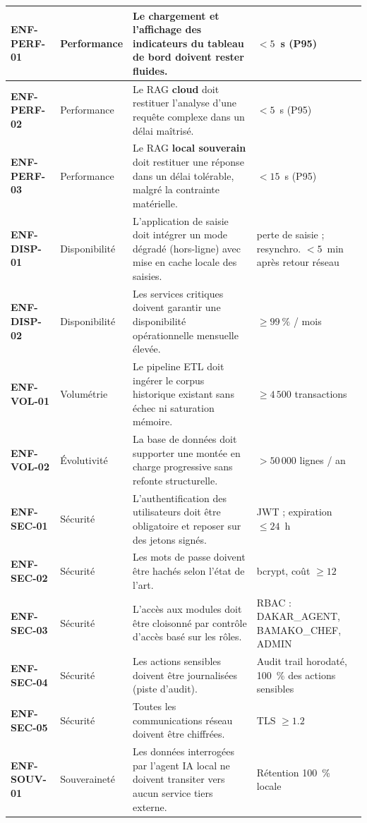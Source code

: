 \begin{longtable}{|>{\raggedright\arraybackslash}p{2.0cm}|>{\raggedright\arraybackslash}p{2.3cm}|>{\raggedright\arraybackslash}p{5.3cm}|>{\raggedright\arraybackslash}p{2.8cm}|}
\textbf{ENF-PERF-01} & Performance & Le chargement et l'affichage des indicateurs du tableau de bord doivent rester fluides. & $< 5$~s (P95) \\ \hline
\textbf{ENF-PERF-02} & Performance & Le RAG \textbf{cloud} doit restituer l'analyse d'une requête complexe dans un délai maîtrisé. & $< 5$~s (P95) \\ \hline
\textbf{ENF-PERF-03} & Performance & Le RAG \textbf{local souverain} doit restituer une réponse dans un délai tolérable, malgré la contrainte matérielle. & $< 15$~s (P95) \\ \hline
\textbf{ENF-DISP-01} & Disponibilité & L'application de saisie doit intégrer un mode dégradé (hors-ligne) avec mise en cache locale des saisies. & 0 perte de saisie ; resynchro. $< 5$~min après retour réseau \\ \hline
\textbf{ENF-DISP-02} & Disponibilité & Les services critiques doivent garantir une disponibilité opérationnelle mensuelle élevée. & $\geq 99~\%$ / mois \\ \hline
\textbf{ENF-VOL-01} & Volumétrie & Le pipeline ETL doit ingérer le corpus historique existant sans échec ni saturation mémoire. & $\geq 4\,500$ transactions \\ \hline
\textbf{ENF-VOL-02} & Évolutivité & La base de données doit supporter une montée en charge progressive sans refonte structurelle. & $> 50\,000$ lignes / an \\ \hline
\textbf{ENF-SEC-01} & Sécurité & L'authentification des utilisateurs doit être obligatoire et reposer sur des jetons signés. & JWT ; expiration $\leq 24$~h \\ \hline
\textbf{ENF-SEC-02} & Sécurité & Les mots de passe doivent être hachés selon l'état de l'art. & bcrypt, coût $\geq 12$ \\ \hline
\textbf{ENF-SEC-03} & Sécurité & L'accès aux modules doit être cloisonné par contrôle d'accès basé sur les rôles. & RBAC : DAKAR\_AGENT, BAMAKO\_CHEF, ADMIN \\ \hline
\textbf{ENF-SEC-04} & Sécurité & Les actions sensibles doivent être journalisées (piste d'audit). & Audit trail horodaté, 100~\% des actions sensibles \\ \hline
\textbf{ENF-SEC-05} & Sécurité & Toutes les communications réseau doivent être chiffrées. & TLS $\geq 1.2$ \\ \hline
\textbf{ENF-SOUV-01} & Souveraineté & Les données interrogées par l'agent IA local ne doivent transiter vers aucun service tiers externe. & Rétention 100~\% locale \\ \hline

\end{longtable}
